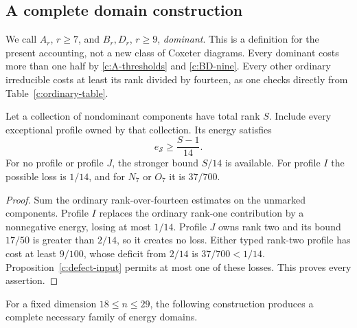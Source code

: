 \subsection{A complete domain construction}
\label{c:cover}

We call $A_r$, $r\ge7$, and $B_r,D_r$, $r\ge9$,
\emph{dominant}. This is a definition for the present accounting, not
a new class of Coxeter diagrams. Every dominant costs more than one
half by \eqref{c:A-thresholds} and \eqref{c:BD-nine}. Every other
ordinary irreducible costs at least its rank divided by fourteen, as
one checks directly from Table~\ref{c:ordinary-table}.

\begin{lemma}\label{c:spectator}
Let a collection of nondominant components have total rank $S$. Include
every exceptional profile owned by that collection. Its energy satisfies
\begin{equation}\label{c:spectator-rate}
                          e_{\mathcal S}\ge\frac{S-1}{14}.
\end{equation}
For no profile or profile $J$, the stronger bound $S/14$ is available.
For profile $I$ the possible loss is $1/14$, and for $N_7$ or $O_7$
it is $37/700$.
\end{lemma}
\begin{proof}
Sum the ordinary rank-over-fourteen estimates on the unmarked components.
Profile $I$ replaces the ordinary rank-one contribution by a nonnegative
energy, losing at most $1/14$. Profile $J$ owns rank two and its bound
$17/50$ is greater than $2/14$, so it creates no loss. Either typed
rank-two profile has cost at least $9/100$, whose deficit from $2/14$ is
$37/700<1/14$. Proposition~\ref{c:defect-input} permits at most one of
these losses. This proves every assertion.
\end{proof}

For a fixed dimension $18\le n\le29$, the following construction produces
a complete necessary family of energy domains.

